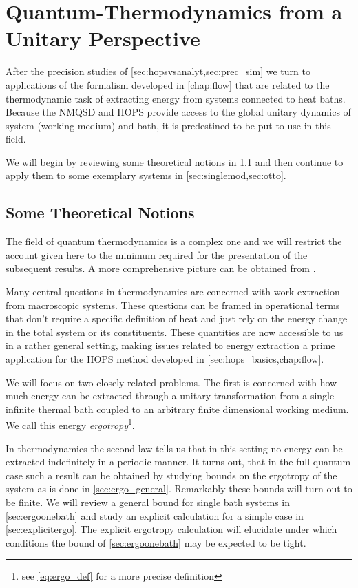 \chapter{Quantum-Thermodynamics from a Unitary Perspective}
\label{sec:therm_results}
After the precision studies of \cref{sec:hopsvsanalyt,sec:prec_sim} we
turn to applications of the formalism developed in \cref{chap:flow}
that are related to the thermodynamic task of extracting energy from
systems connected to heat baths. Because the NMQSD and HOPS provide
access to the global unitary dynamics of system (working medium) and
bath, it is predestined to be put to use in this field.

We will begin by reviewing some theoretical notions in
\cref{sec:basic_thermo} and then continue to apply them to some
exemplary systems in \cref{sec:singlemod,sec:otto}.

\section{Some Theoretical Notions}
\label{sec:basic_thermo}
The field of quantum thermodynamics is a complex one and we will
restrict the account given here to the minimum required for the
presentation of the subsequent results. A more comprehensive picture
can be obtained from
\cite{Binder2018,Kurizki2021Dec,Talkner2020Oct,Vinjanampathy2016Oct}.

Many central questions in thermodynamics are concerned with work
extraction from macroscopic systems. These questions can be framed in
operational terms that don't require a specific definition of heat and
just rely on the energy change in the total system or its
constituents. These quantities are now accessible to us in a rather
general setting, making issues related to energy extraction a prime
application for the HOPS method developed in
\cref{sec:hops_basics,chap:flow}.

We will focus on two closely related problems. The first is concerned
with how much energy can be extracted through a unitary transformation
from a single infinite thermal bath coupled to an arbitrary finite
dimensional working medium. We call this energy
\emph{ergotropy}\footnote{see \cref{eq:ergo_def} for a more precise
  definition}.

In thermodynamics the second law tells us that in this setting no
energy can be extracted indefinitely in a periodic manner.  It turns
out, that in the full quantum case such a result can be obtained by
studying bounds on the ergotropy of the system as is done in
\cref{sec:ergo_general}. Remarkably these bounds will turn out to be
finite. We will review a general bound for single bath systems in
\cref{sec:ergoonebath} and study an explicit calculation for a simple
case in \cref{sec:explicitergo}. The
explicit ergotropy calculation will elucidate under which conditions
the bound of \cref{sec:ergoonebath} may be expected to be tight.

